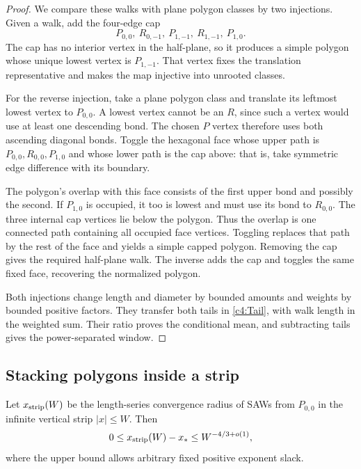 \begin{proof}
We compare these walks with plane polygon classes by two injections.
Given a walk, add the four-edge cap
\[
 P_{0,0},\ R_{0,-1},\ P_{1,-1},\ R_{1,-1},\ P_{1,0}.
\]
The cap has no interior vertex in the half-plane, so it produces a simple polygon
whose unique lowest vertex is $P_{1,-1}$. That vertex fixes the
translation representative and makes the map injective into unrooted
classes.

For the reverse injection, take a plane polygon class and translate its
leftmost lowest vertex to $P_{0,0}$. A lowest vertex cannot be an $R$,
since such a vertex would use at least one descending bond. The chosen
$P$ vertex therefore uses both ascending diagonal bonds. Toggle the
hexagonal face whose upper path is
$P_{0,0},R_{0,0},P_{1,0}$ and whose lower path is the cap above:
that is, take symmetric edge difference with its boundary.

The polygon's overlap with this face consists of the first upper bond
and possibly the second. If $P_{1,0}$ is occupied, it too is lowest and
must use its bond to $R_{0,0}$. The three internal cap vertices lie below
the polygon. Thus the overlap is one connected
path containing all occupied face vertices. Toggling replaces that path
by the rest of the face and yields a simple capped polygon. Removing
the cap gives the required half-plane walk. The inverse adds the cap
and toggles the same fixed face, recovering the normalized polygon.

Both injections change length and diameter by bounded amounts and
weights by bounded positive factors. They transfer both tails in
\eqref{c4:Tail}, with walk length in the weighted sum. Their ratio
proves the conditional mean, and subtracting tails gives the
power-separated window.
\end{proof}

\subsection{Stacking polygons inside a strip}

\begin{proposition}
\label{prop:strip-radius}
Let $x_{\rm strip}(W)$ be the length-series convergence radius of SAWs
from $P_{0,0}$ in the infinite vertical strip $|x|\le W$. Then
\[
 0\le x_{\rm strip}(W)-x_*\le W^{-4/3+o(1)},
\]
where the upper bound allows arbitrary fixed positive exponent slack.
\end{proposition}

